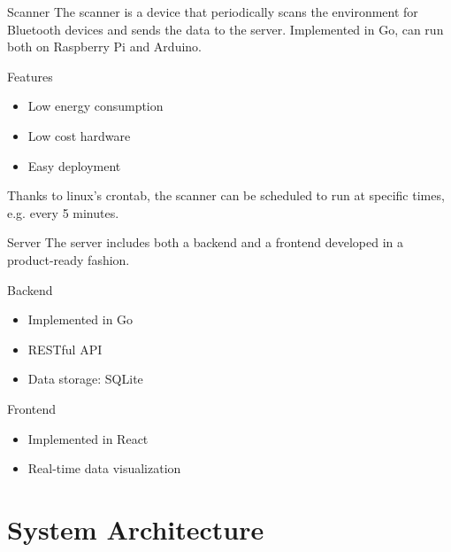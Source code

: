 \documentclass{beamer}
\begin{document}
\begin{frame}{Scanner}
	The scanner is a device that periodically scans \footnotemark the environment for Bluetooth devices and sends the data to the server.
	\vspace{1em}
	Implemented in Go, can run both on Raspberry Pi and Arduino\footnotemark.
	\begin{block}
		{Features}
		\begin{itemize}
			\item Low energy consumption
			\item Low cost hardware
			\item Easy deployment
		\end{itemize}
	\end{block}

	Thanks to linux's crontab, the scanner can be scheduled to run at specific times, e.g. every 5 minutes.

\end{frame}
\begin{frame}{Server}
	The server includes both a backend and a frontend developed in a product-ready fashion.
	\begin{block}
		{Backend}
		\begin{itemize}
			\item Implemented in Go
			\item RESTful API
			\item Data storage: SQLite
		\end{itemize}
	\end{block}

	\begin{block}
		{Frontend}
		\begin{itemize}
			\item Implemented in React
			\item Real-time data visualization
		\end{itemize}
	\end{block}

\end{frame}

\section{System Architecture}
\end{document}
